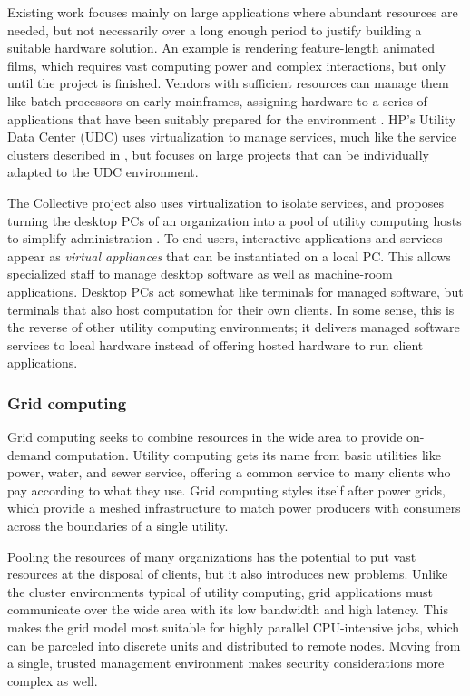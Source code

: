 Existing work focuses mainly on large applications where abundant resources are needed, but not necessarily over a long enough period to justify building a suitable hardware solution. An example is rendering feature-length animated films, which requires vast computing power and complex interactions, but only until the project is finished. Vendors with sufficient resources can manage them like batch processors on early mainframes, assigning hardware to a series of applications that have been suitably prepared for the environment \cite{wilkes04}. HP's Utility Data Center (UDC) \cite{kallahalla} uses virtualization to manage services, much like the service clusters described in , but focuses on large projects that can be individually adapted to the UDC environment.

The Collective project also uses virtualization to isolate services, and proposes turning the desktop PCs of an organization into a pool of utility computing hosts to simplify administration \cite{sapuntzakis03}. To end users, interactive applications and services appear as \emph{virtual appliances} that can be instantiated on a local PC. This allows specialized staff to manage desktop software as well as machine-room applications. Desktop PCs act somewhat like terminals for managed software, but terminals that also host computation for their own clients. In some sense, this is the reverse of other utility computing environments; it delivers managed software services to local hardware instead of offering hosted hardware to run client applications.

\subsubsection{Grid computing}

Grid computing \cite{foster,sungrid} seeks to combine resources in the wide area to provide on-demand computation. Utility computing gets its name from basic utilities like power, water, and sewer service, offering a common service to many clients who pay according to what they use. Grid computing styles itself after power grids, which provide a meshed infrastructure to match power producers with consumers across the boundaries of a single utility.

Pooling the resources of many organizations has the potential to put vast resources at the disposal of clients, but it also introduces new problems. Unlike the cluster environments typical of utility computing, grid applications must communicate over the wide area with its low bandwidth and high latency. This makes the grid model most suitable for highly parallel CPU-intensive jobs, which can be parceled into discrete units and distributed to remote nodes. Moving from a single, trusted management environment makes security considerations more complex as well.

